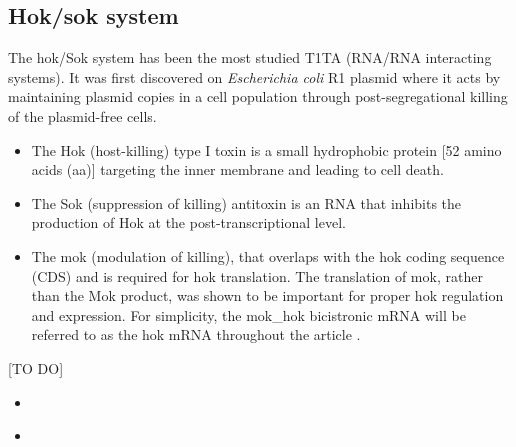 \subsection{Hok/sok system}
The hok/Sok system has been the most studied T1TA (RNA/RNA interacting systems). It was first discovered on 
\textit{Escherichia coli} R1 plasmid where it acts by maintaining plasmid copies in a cell population through post-segregational 
killing of the plasmid-free cells. 

\begin{itemize}
    \item The Hok (host-killing) type I toxin is a small hydrophobic protein [52 amino acids (aa)] targeting the inner membrane and 
        leading to cell death.
    \item The Sok (suppression of killing) antitoxin is an RNA that inhibits the production of Hok at the post-transcriptional level.
    \item The mok (modulation of killing), that overlaps with the hok coding sequence (CDS) and is required for hok translation. 
    The translation of mok, rather than the Mok product, was shown to be important for proper hok regulation and expression. 
    For simplicity, the mok\_hok bicistronic mRNA will be referred to as the hok mRNA throughout the article  \cite{Rhun2022}.
\end{itemize}

[TO DO]
\begin{itemize}
    \item {} \cite{Khedkar2022}
    \item {} \cite{Harms2018}
\end{itemize}
